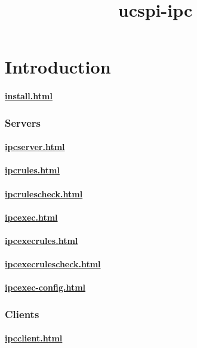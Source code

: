 \documentclass{book}
\title{ucspi-ipc}
\begin{document}
\section{Introduction}

\paragraph{\href{How to install ucspi-ipc}{install.html}}

\subsubsection{Servers}
\paragraph{\href{The \cmd{ipcserver} program}{ipcserver.html}}
\paragraph{\href{The \cmd{ipcrules} program}{ipcrules.html}}
\paragraph{\href{The \cmd{ipcrulescheck} program}{ipcrulescheck.html}}

\paragraph{\href{The \cmd{ipcexec} program}{ipcexec.html}}
\paragraph{\href{The \cmd{ipcexecrules} program}{ipcexecrules.html}}
\paragraph{\href{The \cmd{ipcexecrulescheck} program}{ipcexecrulescheck.html}}
\paragraph{\href{The \cmd{ipcexec-config} program}{ipcexec-config.html}}

\subsubsection{Clients}
\paragraph{\href{The \cmd{ipcclient} program}{ipcclient.html}}
\end{document}

